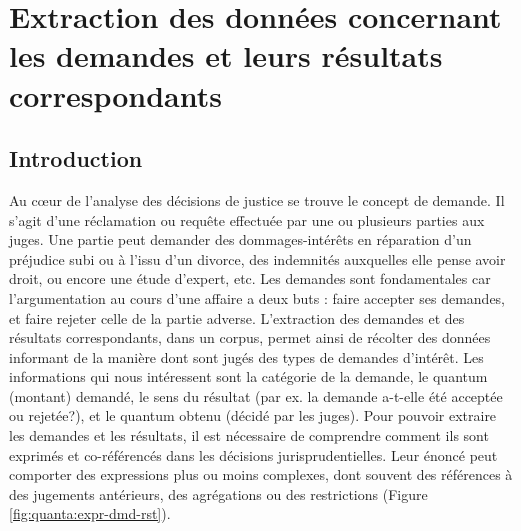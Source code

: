 \chapter{Extraction des données concernant les demandes et leurs résultats correspondants}
\label{chap:quanta}

\section{Introduction}
\label{sec:quanta:introduction}
Au c\oe{}ur de l'analyse des décisions de justice se trouve le concept de demande. Il s'agit d'une réclamation ou requête effectuée par une ou plusieurs parties aux juges. Une partie peut demander des dommages-intérêts en réparation d'un préjudice subi ou à l'issu d'un divorce, des indemnités auxquelles elle pense avoir droit, ou encore une étude d'expert, etc. Les demandes sont fondamentales car l'argumentation au cours d'une affaire a deux buts : faire accepter ses demandes, et faire rejeter celle de la partie adverse. L'extraction des demandes et des résultats correspondants, dans un corpus, permet ainsi de récolter des données informant de la manière dont sont jugés des types de demandes d'intérêt. Les informations qui nous intéressent sont la catégorie de la demande, le quantum (montant) demandé, le sens du résultat (par ex. la demande a-t-elle été acceptée ou rejetée?), et le quantum obtenu (décidé par les juges). Pour pouvoir extraire les demandes et les résultats, il est nécessaire de comprendre comment ils sont exprimés et co-référencés dans les décisions jurisprudentielles. Leur énoncé peut comporter des expressions plus ou moins complexes, dont souvent des références à des jugements antérieurs, des agrégations ou des restrictions (Figure \ref{fig:quanta:expr-dmd-rst}).

